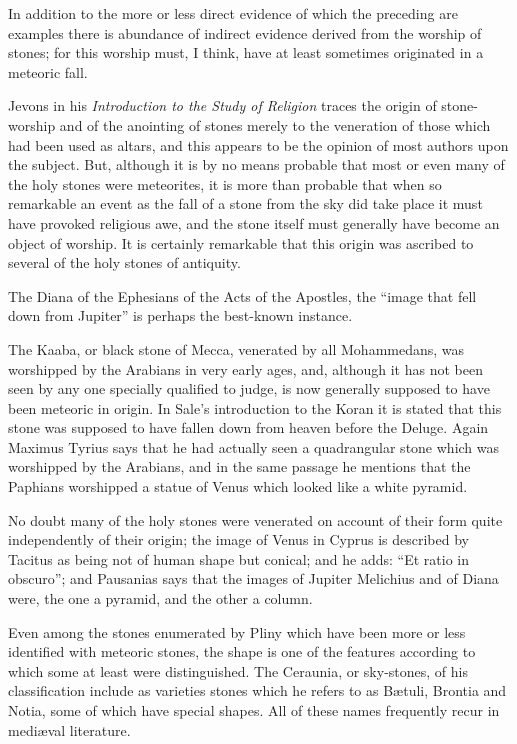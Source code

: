 \documentclass[a4paper, 11pt, oneside]{article}
\begin{document}
In addition to the more or less direct evidence of which the preceding are examples there is abundance of indirect evidence derived from the worship of stones; for this worship must, I think, have at least sometimes originated in a meteoric fall. 

Jevons in his \emph{Introduction to the Study of Religion} traces the origin of stone-worship and of the anointing of stones merely to the veneration of those which had been used as altars, and this appears to be the opinion of most authors upon the subject. But, although it is by no means probable that most or even many of the holy stones were meteorites, it is more than probable that when so remarkable an event as the fall of a stone from the sky did take place it must have provoked religious awe, and the stone itself must generally have become an object of worship. It is certainly remarkable that this origin was ascribed to several of the holy stones of antiquity. 

The Diana of the Ephesians of the Acts of the Apostles, the ``image that fell down from Jupiter'' is perhaps the best-known instance. 

The Kaaba, or black stone of Mecca, venerated by all Mohammedans, was worshipped by the Arabians in very early ages, and, although it has not been seen by any one specially qualified to judge, is now generally supposed to have been meteoric in origin. In Sale's introduction to the Koran it is stated that this stone was supposed to have fallen down from heaven before the Deluge. Again Maximus Tyrius says that he had actually seen a quadrangular stone which was worshipped by the Arabians, and in the same passage he mentions that the Paphians worshipped a statue of Venus which looked like a white pyramid. 

No doubt many of the holy stones were venerated on account of their form quite independently of their origin; the image of Venus in Cyprus is described by Tacitus as being not of human shape but conical; and he adds: ``Et ratio in obscuro''; and Pausanias says that the images of Jupiter Melichius and of Diana were, the one a pyramid, and the other a column. 

Even among the stones enumerated by Pliny which have been more or less identified with meteoric stones, the shape is one of the features according to which some at least were distinguished. The Ceraunia, or sky-stones, of his classification include as varieties stones which he refers to as Bætuli, Brontia and Notia, some of which have special shapes. All of these names frequently recur in mediæval literature. 
\end{document}
